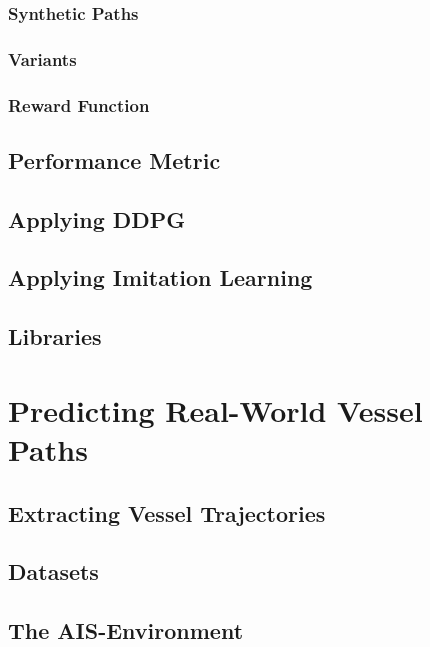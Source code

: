         \subsubsection{Synthetic Paths}
        
        \subsubsection{Variants}\label{subchap:variants}
        
        \subsubsection{Reward Function}\label{subchap:reward}
        
        
    \subsection{Performance Metric}
    
    \subsection{Applying DDPG}
    
    \newpage
    \subsection{Applying Imitation Learning} \label{subchap:applyBC}
    
    \subsection{Libraries}
    
    
\newpage
\section{Predicting Real-World Vessel Paths}\label{chap:realworld}

    \subsection{Extracting Vessel Trajectories}
    
    \subsection{Datasets}
    
    \subsection{The AIS-Environment}
    
